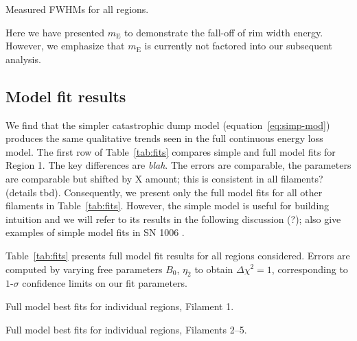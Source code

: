 \documentclass[iop, apj, numberedappendix, twocolappendix]{emulateapj}
\newcommand*{\mE}{m_\mathrm{E}}
\begin{document}
\begin{table*}[ht]
    \tiny
    \centering
    \caption{Measured FWHMs for all regions.\label{tab:fwhms}}
    
\end{table*}

Here we have presented $\mE$ to demonstrate the fall-off of rim width energy.
However, we emphasize that $\mE$ is currently not factored into our subsequent
analysis.


\subsection{Model fit results}
\label{sec:fit-results}


We find that the simpler catastrophic dump model (equation~\eqref{eq:simp-mod})
produces the same qualitative trends seen in the full continuous energy loss
model.
The first row of Table~\ref{tab:fits} compares simple and full model fits for
Region 1.
The key differences are \emph{blah}.  The errors are comparable, the parameters
are comparable but shifted by X amount; this is consistent in all filaments?
(details tbd).
Consequently, we present only the full model fits for all other
filaments in Table~\ref{tab:fits}.  However, the simple model is useful for
building intuition and we will refer to its results in the following discussion
(?);  also give examples of simple model fits in SN
1006 .

Table~\ref{tab:fits} presents full model fit results for all regions
considered. Errors are computed by varying free parameters $B_0$,
$\eta_2$ to obtain $\Delta\chi^2 = 1$, corresponding to $1$-$\sigma$ confidence
limits on our fit parameters.
\begin{table}[ht]
    \tiny
    \centering
    \caption{Full model best fits for individual regions, Filament 1.
    \label{tab:fits}}
    
\end{table}

\begin{table}[ht]
    \tiny
    \centering
    \caption{Full model best fits for individual regions, Filaments 2--5.
    \label{tab:fits-pt2}}
    
\end{table}
\end{document}
